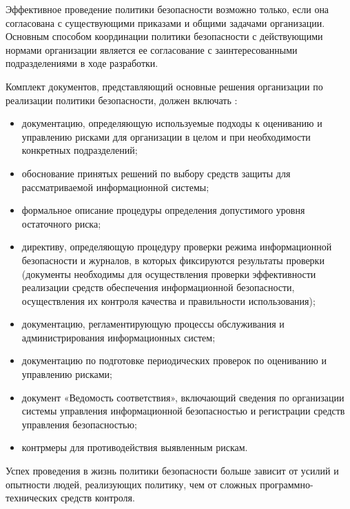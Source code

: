 Эффективное проведение политики безопасности возможно только, если она согласована с существующими приказами
и общими задачами организации. Основным способом координации политики безопасности с действующими нормами
организации является ее согласование с заинтересованными подразделениями в ходе разработки.

Комплект документов, представляющий основные решения организации по реализации политики безопасности,
должен включать \autocite{nurzhanov}:
\begin{itemize}
    \item
        документацию, определяющую используемые подходы к оцениванию и управлению рисками для
        организации в целом и при необходимости конкретных подразделений;

    \item
        обоснование принятых решений по выбору средств защиты для рассматриваемой информационной системы;

    \item
        формальное описание процедуры определения допустимого уровня остаточного риска;

    \item
        директиву, определяющую процедуру проверки режима информационной безопасности и журналов,
        в которых фиксируются результаты проверки (документы необходимы для осуществления проверки
        эффективности реализации средств обеспечения информационной безопасности, осуществления
        их контроля качества и правильности использования);

    \item
        документацию, регламентирующую процессы обслуживания и администрирования информационных систем;

    \item
        документацию по подготовке периодических проверок по оцениванию и управлению рисками;

    \item
        документ «Ведомость соответствия», включающий сведения по организации системы управления
        информационной безопасностью и регистрации средств управления безопасностью;

    \item
        контрмеры для противодействия выявленным рискам.
\end{itemize}

Успех проведения в жизнь политики безопасности больше зависит от усилий и опытности людей, реализующих политику,
чем от сложных программно-технических средств контроля.

